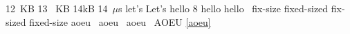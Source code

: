  12~KB
13 ~KB
14kB
14~$\mu$s
let's
Let's
hello\cite{aoeu}
8\x{}
hello \x{}
hello~\x{}
\x{}
\cite{}
 \cite{}
fix-size
fixed-sized
fix-sized
fixed-size
aoeu~
aoeu~
aoeu~
AOEU \ref{aoeu}
